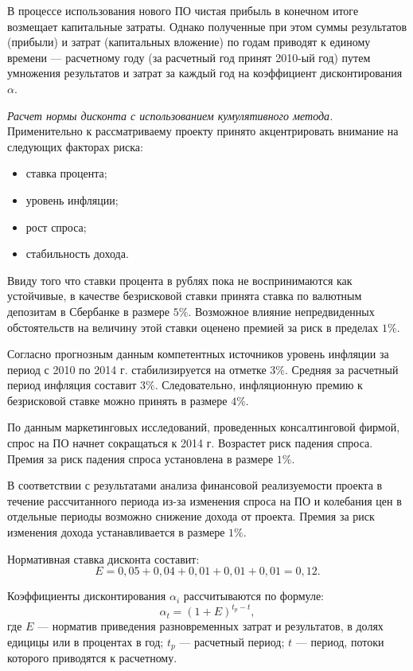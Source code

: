 В процессе использования нового ПО чистая прибыль в конечном итоге возмещает капитальные затраты. Однако полученные при этом суммы результатов (прибыли) и затрат (капитальных вложение) по годам приводят к единому времени --- расчетному году (за расчетный год принят 2010-ый год) путем умножения результатов и затрат за каждый год на коэффициент дисконтирования $\alpha$.

\emph{Расчет нормы дисконта с использованием кумулятивного метода.} Применительно к рассматриваему проекту принято акцентрировать внимание на следующих факторах риска:
\begin{itemize}
  \item ставка процента;
  \item уровень инфляции;
  \item рост спроса;
  \item стабильность дохода.
\end{itemize}

Ввиду того что ставки процента в рублях пока не воспринимаются как устойчивые, в качестве безрисковой ставки принята ставка по валютным депозитам в Сбербанке в размере $5\%$. Возможное влияние непредвиденных обстоятельств на величину этой ставки оценено премией за риск в пределах $1\%$.

Согласно прогнозным данным компетентных источников уровень инфляции за период с 2010 по 2014 г. стабилизируется на отметке $3\%$. Средняя за расчетный период инфляция составит $3\%$. Следовательно, инфляционную премию к безрисковой ставке можно принять в размере $4\%$.

По данным маркетинговых исследований, проведенных консалтинговой фирмой, спрос на ПО начнет сокращаться к 2014 г. Возрастет риск падения спроса. Премия за риск падения спроса установлена в размере $1\%$.

В соответствии с результатами анализа финансовой реализуемости проекта в течение рассчитанного периода из-за изменения спроса на ПО и колебания цен в отдельные периоды возможно снижение дохода от проекта. Премия за риск изменения дохода устанавливается в размере $1\%$.

Нормативная ставка дисконта составит:
\begin{displaymath}
  E = 0,05 + 0,04 + 0,01 + 0,01 + 0,01 = 0,12.
\end{displaymath}

Коэффициенты дисконтирования $\alpha_i$ рассчитываются по формуле:
\begin{displaymath}
  \alpha_t = (1 + E)^{t_p - t},
\end{displaymath}
где $E$ --- норматив приведения разновременных затрат и результатов, в долях едицицы или в процентах в год; $t_p$ --- расчетный период; $t$ --- период, потоки которого приводятся к расчетному.

